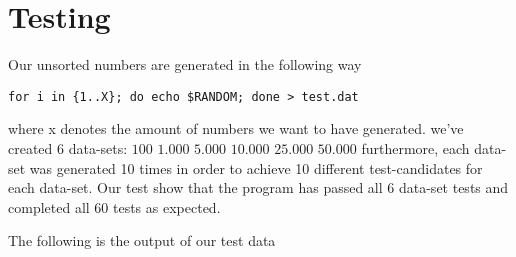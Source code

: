 \section{Testing}

Our unsorted numbers are generated in the following way
\begin{lstlisting}
for i in {1..X}; do echo $RANDOM; done > test.dat
\end{lstlisting}
where x denotes the amount of numbers we want to have generated.
we've created 6 data-sets: $100$ $1.000$ $5.000$ $10.000$ $25.000$ $50.000$
furthermore, each data-set was generated 10 times in order to achieve 10 different test-candidates for each data-set.
Our test show that the program has passed all 6 data-set tests and completed all 60 tests as expected.

The following is the output of our test data

